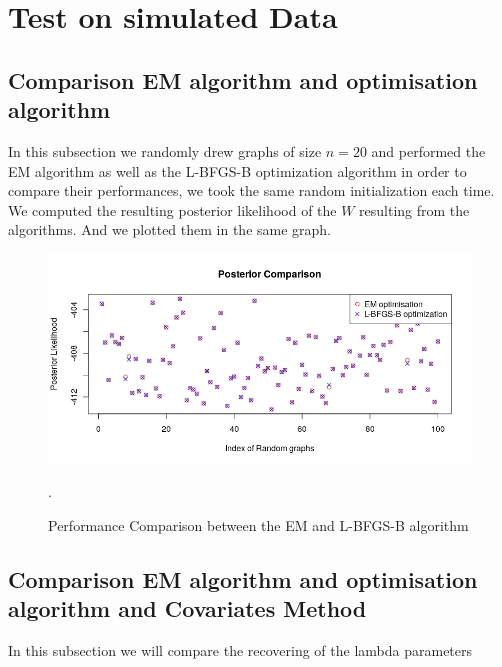 \documentclass[12pt]{ociamthesis}  %
\begin{document}
	\section{Test on simulated Data}
	
	\subsection{Comparison EM algorithm and optimisation algorithm}
	
	In this subsection we randomly drew graphs of size $n = 20$ and performed the EM algorithm as well as the L-BFGS-B optimization algorithm in order to compare their performances, we took the same random initialization each time. We computed the resulting posterior likelihood of the $W$ resulting from the algorithms. And we plotted them in the same graph.
	\begin{figure}[H]
		\centering
		\includegraphics[scale=0.70]{PosteriorCOmparisonEMOpt} %
		\caption{Performance Comparison between the EM and L-BFGS-B algorithm}.
	\end{figure}
	
	\subsection{Comparison EM algorithm and optimisation algorithm and Covariates Method}
	
	In this subsection we will compare the recovering of the lambda parameters 
\end{document}
